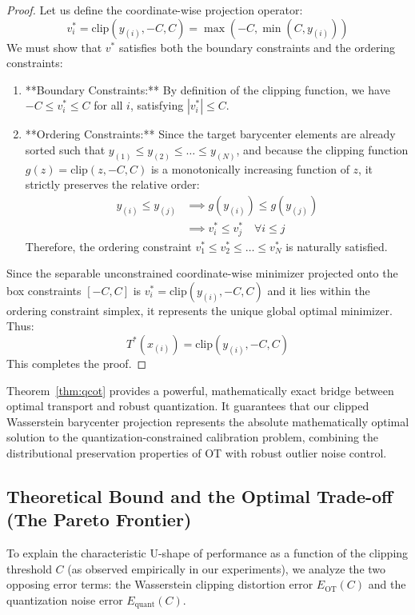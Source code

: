 \documentclass{article}
\theoremstyle{plain}
\theoremstyle{definition}
\theoremstyle{remark}
\begin{document}
\begin{proof}
Let us define the coordinate-wise projection operator:
\begin{equation}
    v_i^* = \text{clip}(y_{(i)}, -C, C) = \max(-C, \min(C, y_{(i)}))
\end{equation}
We must show that $v^*$ satisfies both the boundary constraints and the ordering constraints:
\begin{enumerate}
    \item **Boundary Constraints:** By definition of the clipping function, we have $-C \le v_i^* \le C$ for all $i$, satisfying $|v_i^*| \le C$.
    \item **Ordering Constraints:** Since the target barycenter elements are already sorted such that $y_{(1)} \le y_{(2)} \le \dots \le y_{(N)}$, and because the clipping function $g(z) = \text{clip}(z, -C, C)$ is a monotonically increasing function of $z$, it strictly preserves the relative order:
    \begin{align}
        y_{(i)} \le y_{(j)} &\implies g(y_{(i)}) \le g(y_{(j)}) \\
        &\implies v_i^* \le v_j^* \quad \forall i \le j
    \end{align}
    Therefore, the ordering constraint $v_1^* \le v_2^* \le \dots \le v_N^*$ is naturally satisfied.
\end{enumerate}
Since the separable unconstrained coordinate-wise minimizer projected onto the box constraints $[-C, C]$ is $v_i^* = \text{clip}(y_{(i)}, -C, C)$ and it lies within the ordering constraint simplex, it represents the unique global optimal minimizer. Thus:
\begin{equation}
    T^*(x_{(i)}) = \text{clip}(y_{(i)}, -C, C)
\end{equation}
This completes the proof.
\end{proof}

Theorem~\ref{thm:qcot} provides a powerful, mathematically exact bridge between optimal transport and robust quantization. It guarantees that our clipped Wasserstein barycenter projection represents the absolute mathematically optimal solution to the quantization-constrained calibration problem, combining the distributional preservation properties of OT with robust outlier noise control.

\subsection{Theoretical Bound and the Optimal Trade-off (The Pareto Frontier)}
To explain the characteristic U-shape of performance as a function of the clipping threshold $C$ (as observed empirically in our experiments), we analyze the two opposing error terms: the Wasserstein clipping distortion error $E_{\text{OT}}(C)$ and the quantization noise error $E_{\text{quant}}(C)$.
\end{document}
